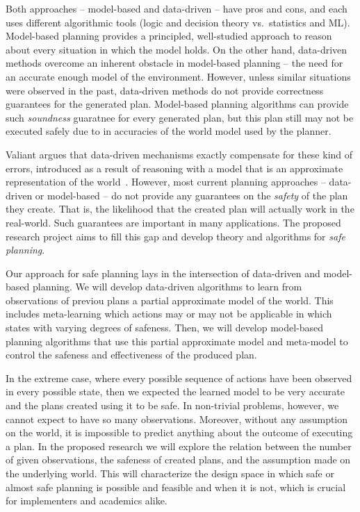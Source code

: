\documentclass[12pt]{article}
\begin{document}
Both approaches -- model-based and data-driven --  have pros and cons, and each uses different algorithmic tools (logic and decision theory vs.~statistics and ML). Model-based planning provides a principled,  well-studied approach to reason about every situation in which the model holds. On the other hand, data-driven methods overcome an inherent obstacle in model-based planning -- the need for an accurate enough model of the environment. However, unless similar situations were observed in the past, data-driven methods do not provide correctness guarantees for the generated plan. Model-based planning algorithms can provide such \emph{soundness} guaratnee for every generated plan, but this plan still may not be executed safely due to in accuracies of the world model used by the planner. 



Valiant argues that data-driven mechanisms exactly compensate for these kind of errors, introduced as a result of  reasoning with a model that is an approximate representation of the world~\cite{valiant2000neuroidal,valiant2000robustLogics}. However, most current planning approaches -- data-driven or model-based -- do not provide any guarantees on the \emph{safety} of the plan they create. That is, the likelihood that the created plan will actually work in the real-world. Such guarantees are important in many applications.  
The proposed research project aims to fill this gap and develop theory and algorithms for \emph{safe planning}. 


Our approach for safe planning lays in the intersection of data-driven and model-based planning. 
We will develop data-driven algorithms to learn from observations of previou plans a partial approximate model of the world. 
This includes meta-learning which actions may or may not be applicable in which states with varying degrees of safeness. 
Then, we will develop model-based planning algorithms that use this partial approximate model and meta-model 
to control the safeness and effectiveness of the produced plan. 



In the extreme case, where every possible sequence of actions have been observed in every possible state, 
then we expected the learned model to be very accurate and the plans created using it to be safe. 
In non-trivial problems, however, we cannot expect to have so many observations. 
Moreover, without any assumption on the world, it is impossible to predict anything about the outcome 
of executing a plan. In the proposed research we will explore 
the relation between the number of given observations, the safeness of created plans, 
and the assumption made on the underlying world. This will characterize the design space 
in which safe or almost safe planning is possible and feasible and when it is not, 
which is crucial for implementers and academics alike. 
\end{document}
